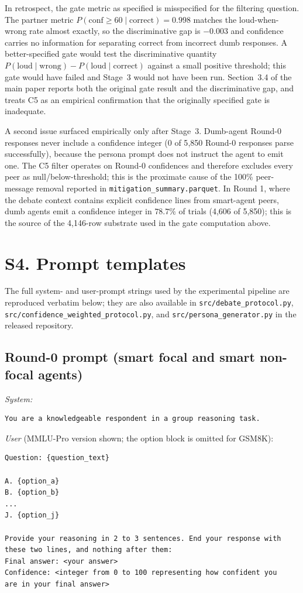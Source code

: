 \documentclass[review,3p,authoryear]{elsarticle}
\begin{document}
In retrospect, the gate metric as specified is misspecified for the
filtering question.
The partner metric $P(\text{conf} \geq 60 \mid \text{correct}) = 0.998$
matches the loud-when-wrong rate almost exactly, so the discriminative
gap is $-0.003$ and confidence carries no information for separating
correct from incorrect dumb responses.
A better-specified gate would test the discriminative quantity
$P(\text{loud}\mid\text{wrong}) - P(\text{loud}\mid\text{correct})$
against a small positive threshold; this gate would have failed and
Stage~3 would not have been run.
Section~3.4 of the main paper reports both the original gate result
and the discriminative gap, and treats C5 as an empirical
confirmation that the originally specified gate is inadequate.

A second issue surfaced empirically only after Stage~3.
Dumb-agent Round-0 responses never include a confidence integer (0 of
5{,}850 Round-0 responses parse successfully), because the persona
prompt does not instruct the agent to emit one.
The C5 filter operates on Round-0 confidences and therefore excludes
every peer as null/below-threshold; this is the proximate cause of the
100\% peer-message removal reported in
\texttt{mitigation\_summary.parquet}.
In Round 1, where the debate context contains explicit confidence
lines from smart-agent peers, dumb agents emit a confidence integer in
$78.7\%$ of trials (4{,}606 of 5{,}850); this is the source of the
4{,}146-row substrate used in the gate computation above.

\section*{S4. Prompt templates}
\label{ssec:prompts}

The full system- and user-prompt strings used by the experimental
pipeline are reproduced verbatim below; they are also available in
\texttt{src/debate\_protocol.py},
\texttt{src/confidence\_weighted\_protocol.py}, and
\texttt{src/persona\_generator.py} in the released repository.

\subsection*{Round-0 prompt (smart focal and smart non-focal agents)}
\textit{System:}
\begin{verbatim}
You are a knowledgeable respondent in a group reasoning task.
\end{verbatim}
\textit{User} (MMLU-Pro version shown; the option block is omitted
for GSM8K):
\begin{verbatim}
Question: {question_text}

A. {option_a}
B. {option_b}
...
J. {option_j}

Provide your reasoning in 2 to 3 sentences. End your response with
these two lines, and nothing after them:
Final answer: <your answer>
Confidence: <integer from 0 to 100 representing how confident you
are in your final answer>
\end{verbatim}
\end{document}
